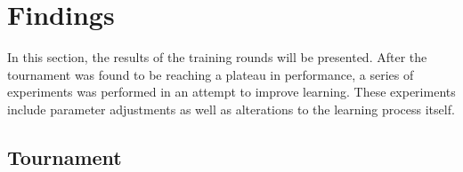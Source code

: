 \section{Findings}
\label{sec:findings}

In this section,
the results of the training rounds will be presented.
%
After the tournament was found to be reaching a plateau in performance,
a series of experiments was performed in an attempt to improve learning.
%
These experiments include parameter adjustments as well as alterations to the
learning process itself.


\subsection{Tournament}






%
